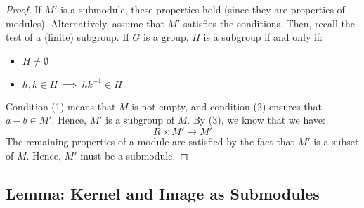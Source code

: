 \documentclass{exam}
\begin{document}

\begin{proof}

If $M'$ is a submodule, these properties hold (since they are properties of modules). Alternatively, assume that $M'$ satisfies the conditions. Then, recall the test of a (finite) subgroup. If $G$ is a group, $H$ is a subgroup if and only if:
\begin{itemize}
    \item $H \neq \emptyset$
    \item $h,k \in H \ \implies \ hk^{-1} \in H$
\end{itemize}
Condition (1) means that $M$ is not empty, and condition (2) ensures that $a - b \in M'$. Hence, $M'$ is a subgroup of $M$. By (3), we know that we have:
\[
R \times M' \to M'
\]
The remaining properties of a module are satisfied by the fact that $M'$ is a subset of $M$. Hence, $M'$ must be a submodule.

\end{proof}

\subsection{Lemma: Kernel and Image as Submodules}

\end{document}
